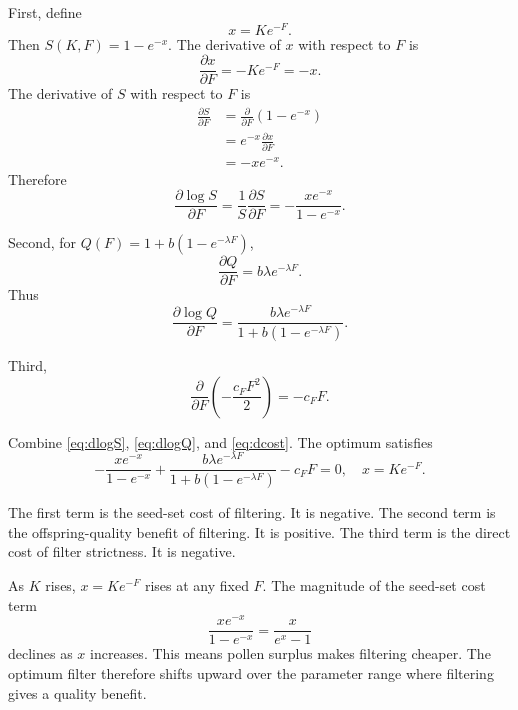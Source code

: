 \documentclass[12pt]{article}
\begin{document}
First, define
\begin{equation}
x=Ke^{-F}.
\end{equation}
Then $S(K,F)=1-e^{-x}$. The derivative of $x$ with respect to $F$ is
\begin{equation}
\frac{\partial x}{\partial F}=-Ke^{-F}=-x.
\end{equation}
The derivative of $S$ with respect to $F$ is
\begin{align}
\frac{\partial S}{\partial F}
&=\frac{\partial}{\partial F}(1-e^{-x}) \\
&=e^{-x}\frac{\partial x}{\partial F} \\
&=-xe^{-x}.
\end{align}
Therefore
\begin{equation}
\frac{\partial \log S}{\partial F}
=\frac{1}{S}\frac{\partial S}{\partial F}
=-\frac{xe^{-x}}{1-e^{-x}}.
\label{eq:dlogS}
\end{equation}

Second, for $Q(F)=1+b(1-e^{-\lambda F})$,
\begin{equation}
\frac{\partial Q}{\partial F}=b\lambda e^{-\lambda F}.
\end{equation}
Thus
\begin{equation}
\frac{\partial \log Q}{\partial F}=
\frac{b\lambda e^{-\lambda F}}{1+b(1-e^{-\lambda F})}.
\label{eq:dlogQ}
\end{equation}

Third,
\begin{equation}
\frac{\partial}{\partial F}\left(-\frac{c_FF^2}{2}\right)=-c_FF.
\label{eq:dcost}
\end{equation}

Combine \eqref{eq:dlogS}, \eqref{eq:dlogQ}, and \eqref{eq:dcost}. The optimum satisfies
\begin{equation}
-\frac{xe^{-x}}{1-e^{-x}}
+
\frac{b\lambda e^{-\lambda F}}{1+b(1-e^{-\lambda F})}
-c_FF=0,
\quad x=Ke^{-F}.
\label{eq:FOCfilter}
\end{equation}

The first term is the seed-set cost of filtering. It is negative. The second term is the offspring-quality benefit of filtering. It is positive. The third term is the direct cost of filter strictness. It is negative.

As $K$ rises, $x=Ke^{-F}$ rises at any fixed $F$. The magnitude of the seed-set cost term
\begin{equation}
\frac{xe^{-x}}{1-e^{-x}}=\frac{x}{e^x-1}
\end{equation}
declines as $x$ increases. This means pollen surplus makes filtering cheaper. The optimum filter therefore shifts upward over the parameter range where filtering gives a quality benefit.
\end{document}
